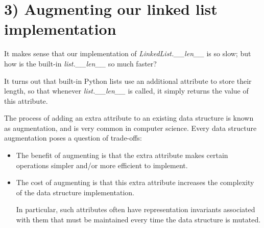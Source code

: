 \documentclass[12pt]{article}
\begin{document}
\section*{3) Augmenting our linked list implementation}
It makes sense that our implementation of \textit{LinkedList.\_\_len\_\_} is so
slow; but how is the built-in \textit{list.\_\_len\_\_} so much faster?

\bigskip

\noindent It turns out that built-in Python lists use an additional attribute to
store their length, so that whenever \textit{list.\_\_len\_\_} is called, it simply
returns the value of this attribute.

\bigskip

\noindent The process of adding an extra attribute to an existing data structure
is known as augmentation, and is very common in computer science. Every data
structure augmentation poses a question of trade-offs:

\begin{itemize}
    \item The benefit of augmenting is that the extra attribute makes certain operations simpler and/or more efficient to implement.
    \item The cost of augmenting is that this extra attribute increases the complexity of the data structure implementation.

    In particular, such attributes often have representation invariants associated with them that must be maintained every time the data structure is mutated.
\end{itemize}

\bigskip
\end{document}
